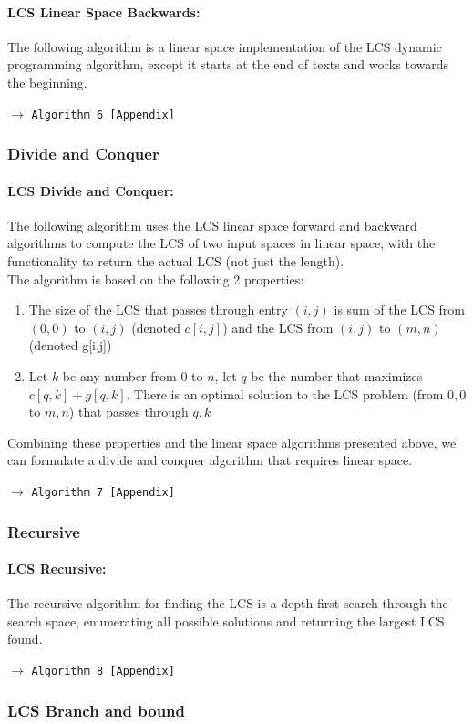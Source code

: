 \documentclass[a4paper,12pt]{article}
\newcommand{\see}[1]{\begin{flushright}$\rightarrow$ \texttt{#1 [Appendix]}\end{flushright}}
\newcommand{\seeAlgorithm}[1]{\see{Algorithm #1}}
\begin{document}
				\paragraph{LCS Linear Space Backwards:} The following algorithm is a linear space implementation of the LCS dynamic programming algorithm, except it starts at the end of texts and works towards the beginning.
					\seeAlgorithm{6}

			\subsubsection{Divide and Conquer}
				\paragraph{LCS Divide and Conquer:} The following algorithm uses the LCS linear space forward and backward algorithms to compute the LCS of two input spaces in linear space, with the functionality to return the actual LCS (not just the length). \\
				The algorithm is based on the following 2 properties:
				\begin{enumerate}
					\item The size of the LCS that passes through entry $(i,j)$ is sum of the LCS from $(0,0)$ to $(i,j)$ (denoted $c[i,j]$) and the LCS from $(i,j)$ to $(m,n)$ (denoted g[i,j])
					\item Let $k$ be any number from $0$ to $n$, let $q$ be the number that maximizes $c[q,k] + g[q,k]$. There is an optimal solution to the LCS problem (from $0,0$ to $m,n$) that passes through $q,k$
				\end{enumerate}
				Combining these properties and the linear space algorithms presented above, we can formulate a divide and conquer algorithm that requires linear space.

					\seeAlgorithm{7}
			\subsubsection{Recursive}
				\paragraph{LCS Recursive:} The recursive algorithm for finding the LCS is a depth first search through the search space, enumerating all possible solutions and returning the largest LCS found.
					\seeAlgorithm{8}

			\subsubsection{LCS Branch and bound}
\end{document}

